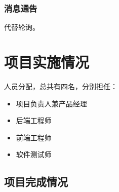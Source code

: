 \documentclass[UTF8]{dingo}
\begin{document}
      \subsubsection{消息通告}
        代替轮询。
  \section{项目实施情况}
    人员分配，总共有四名，分别担任：
    \begin{itemize}
      \item 项目负责人兼产品经理
      \item 后端工程师
      \item 前端工程师
      \item 软件测试师
    \end{itemize}
    \subsection{项目完成情况}
\end{document}
